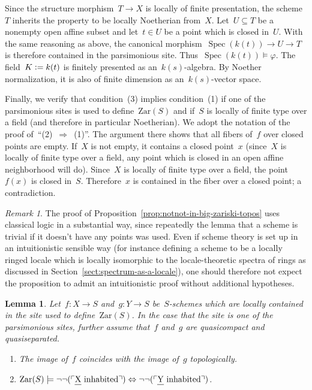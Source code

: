 \documentclass[10pt,reqno,a4paper]{amsbook}
\makeatletter
\theoremstyle{definition}
\theoremstyle{plain}
\newtheorem{lemma}[defn]{Lemma}
\theoremstyle{remark}
\newtheorem{rem}[defn]{Remark}
\let\oldul\ul
\renewcommand{\ul}[1]{\text{\oldul{$#1$}}}
\newcommand{\Zar}{\mathrm{Zar}}
\DeclareMathOperator{\Spec}{Spec}
\newcommand{\?}{\,{:}\,}
\renewcommand{\_}{\mathpunct{.}\,}
\newcommand{\speak}[1]{\ulcorner\text{\textnormal{#1}}\urcorner}
\newcommand{\defeq}{\vcentcolon=}
\renewenvironment{proof}[1][\proofname]{\par
  \pushQED{\qed}%
  \normalfont \topsep6\p@\@plus6\p@\relax
  \trivlist
  \item[\hskip\labelsep
        \itshape
    #1\@addpunct{.}]\ignorespaces
}{%
  \popQED\endtrivlist\@endpefalse
}
\makeatother
\begin{document}
\begin{proof}
Since the structure morphism~$T \to X$ is locally of finite presentation, the
scheme~$T$ inherits the property to be locally Noetherian from~$X$. Let~$U
\subseteq T$ be a nonempty open affine subset and let~$t \in U$ be a point
which is closed in~$U$. With the same reasoning as above, the canonical
morphism~$\Spec(k(t)) \to U \to T$ is therefore contained in the parsimonious
site. Thus~$\Spec(k(t)) \models \varphi$. The field~$K \defeq k(t)$ is finitely
presented as an~$k(s)$-algebra. By Noether normalization, it is also of finite
dimension as an~$k(s)$-vector space.

Finally, we verify that condition~(3) implies condition~(1) if one of the
parsimonious sites is used to define~$\Zar(S)$ and if~$S$ is locally
of finite type over a field (and therefore in particular Noetherian). We adopt
the notation of the proof of~``(2)~$\Rightarrow$~(1)''. The argument there
shows that all fibers of~$f$ over closed points are empty. If~$X$ is not empty,
it contains a closed point~$x$ (since~$X$ is locally of finite type over a field,
any point which is closed in an open affine neighborhood will do). Since~$X$
is locally of finite type over a field, the point~$f(x)$ is closed in~$S$.
Therefore~$x$ is contained in the fiber over a closed point; a contradiction.
\end{proof}

\begin{rem}The proof of Proposition~\ref{prop:notnot-in-big-zariski-topos} uses
classical logic in a substantial way, since repeatedly the lemma that a scheme
is trivial if it doesn't have any points was used. Even if scheme theory is
set up in an intuitionistic sensible way (for instance defining a scheme to be
a locally ringed locale which is locally isomorphic to the locale-theoretic
spectra of rings as discussed in Section~\ref{sect:spectrum-as-a-locale}), one
should therefore not expect the proposition to admit an intuitionistic proof
without additional hypotheses.
\end{rem}

\begin{lemma}\label{lemma:image-coincides}
Let~$f : X \to S$ and~$g : Y \to S$ be~$S$-schemes which are locally contained
in the site used to define~$\Zar(S)$. In the case that the site is one of the
parsimonious sites, further assume that~$f$ and~$g$ are quasicompact and quasiseparated.
\begin{enumerate}
\item The image of~$f$ coincides with the image of~$g$ topologically.
\item $\Zar(S) \models \neg\neg(\speak{$\ul{X}$ inhabited}) \Leftrightarrow
  \neg\neg(\speak{$\ul{Y}$ inhabited})$.
\end{enumerate}
\end{lemma}
\end{document}
